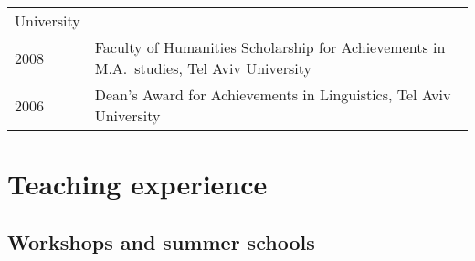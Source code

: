 \documentclass[]{article}
\begin{document}
\begin{longtable}[]{@{}ll@{}}
\begin{minipage}[t]{0.69\columnwidth}
University\strut
\end{minipage}\tabularnewline
\begin{minipage}[t]{0.25\columnwidth}\raggedright
2008\strut
\end{minipage} & \begin{minipage}[t]{0.69\columnwidth}\raggedright
Faculty of Humanities Scholarship for Achievements in M.A.~studies, Tel
Aviv University\strut
\end{minipage}\tabularnewline
\begin{minipage}[t]{0.25\columnwidth}\raggedright
2006\strut
\end{minipage} & \begin{minipage}[t]{0.69\columnwidth}\raggedright
Dean's Award for Achievements in Linguistics, Tel Aviv University\strut
\end{minipage}\tabularnewline
\bottomrule
\end{longtable}

\hypertarget{teaching-experience}{%
\section{Teaching experience}\label{teaching-experience}}

\hypertarget{workshops-and-summer-schools}{%
\subsection{Workshops and summer
schools}\label{workshops-and-summer-schools}}
\end{document}
